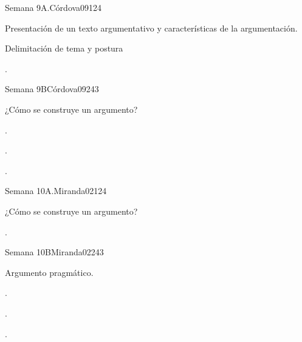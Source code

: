 \begin{syllabus}
\begin{unit}{}{Semana 9A.}{Córdova09}{12}{4}
   \begin{topics}
      \item Presentación de un texto argumentativo y características de la argumentación.
      \item Delimitación de tema y postura

   \end{topics}
   \begin{learningoutcomes}
      \item . 
   \end{learningoutcomes}
\end{unit}

\begin{unit}{}{Semana 9B}{Córdova09}{24}{3}
   \begin{topics}
      \item ¿Cómo se construye un argumento?
   \end{topics}

   \begin{learningoutcomes}
      \item . 
      \item .
      \item . 
      \end{learningoutcomes}
\end{unit}

\begin{unit}{}{Semana 10A.}{Miranda02}{12}{4}
   \begin{topics}
      \item ¿Cómo se construye un argumento?
   \end{topics}
   \begin{learningoutcomes}
      \item . 
   \end{learningoutcomes}
\end{unit}

\begin{unit}{}{Semana 10B}{Miranda02}{24}{3}
   \begin{topics}
      \item  Argumento pragmático.
   \end{topics}

   \begin{learningoutcomes}
      \item . 
      \item .
      \item . 
      \end{learningoutcomes}
\end{unit}


\end{syllabus}
